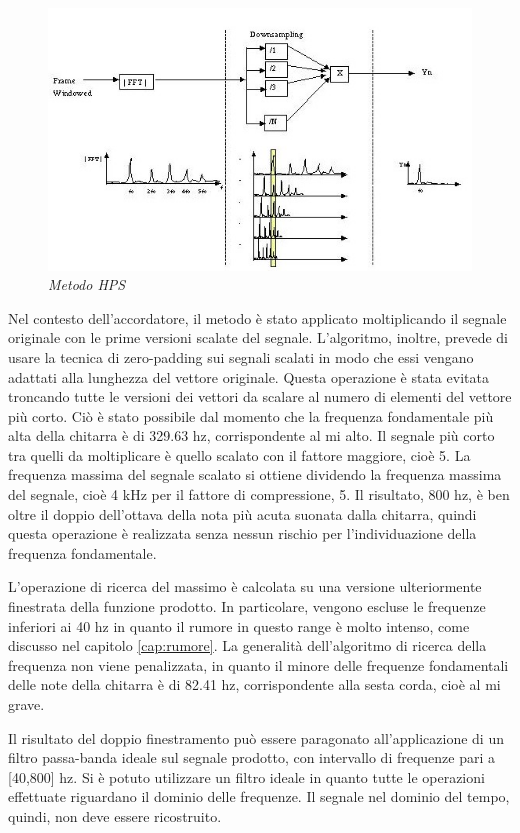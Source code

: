 	\begin{figure}[h]
	  \begin{center} 
	    \includegraphics[width=\textwidth*\real{0.9}]{images/ch_04/processo.jpg}
	  \end{center} 
	  \caption{\textit{Metodo HPS}}  
	  \label{fig:HPS}
	\end{figure}

Nel contesto dell'accordatore, il metodo è stato applicato moltiplicando il segnale originale con le prime versioni scalate del segnale.
L'algoritmo, inoltre, prevede di usare la tecnica di zero-padding sui segnali scalati in modo che essi vengano adattati alla lunghezza del vettore originale. 
Questa operazione è stata evitata troncando tutte le versioni dei vettori da scalare al numero di elementi del vettore più corto.
Ciò è stato possibile dal momento che la frequenza fondamentale più alta della chitarra è di 329.63 hz, corrispondente al \mbox{mi} alto.
Il segnale più corto tra quelli da moltiplicare è quello scalato con il fattore maggiore, cioè 5.
La frequenza massima del segnale scalato si ottiene dividendo la frequenza massima del segnale, cioè 4 kHz per il fattore di compressione, 5. 
Il risultato, 800 hz, è ben oltre il doppio dell'ottava della nota più acuta suonata dalla chitarra, quindi questa operazione è realizzata senza nessun rischio per l'individuazione della frequenza fondamentale.

L'operazione di ricerca del massimo è calcolata su una versione ulteriormente finestrata della funzione prodotto. 
In particolare, vengono escluse le frequenze inferiori ai 40 hz in quanto il rumore in questo range è molto intenso, come discusso nel capitolo \ref{cap:rumore}.
La generalità dell'algoritmo di ricerca della frequenza non viene penalizzata, in quanto il minore delle frequenze fondamentali delle note della chitarra è di 82.41 hz, corrispondente alla sesta corda, cioè al \mbox{mi} grave.

Il risultato del doppio finestramento può essere paragonato all'applicazione di un filtro passa-banda ideale sul segnale prodotto, con intervallo di frequenze pari a [40,800] hz.
Si è potuto utilizzare un filtro ideale in quanto tutte le operazioni effettuate riguardano il dominio delle frequenze.
Il segnale nel dominio del tempo, quindi, non deve essere ricostruito.




